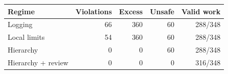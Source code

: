 \begin{tabular}{@{}lrrrr@{}}
\toprule
Regime & Violations & Excess & Unsafe & Valid work\\
\midrule
Logging & 66 & 360 & 60 & 288/348\\
Local limits & 54 & 360 & 60 & 288/348\\
Hierarchy & 0 & 0 & 60 & 288/348\\
Hierarchy + review & 0 & 0 & 0 & 316/348\\
\bottomrule
\end{tabular}
